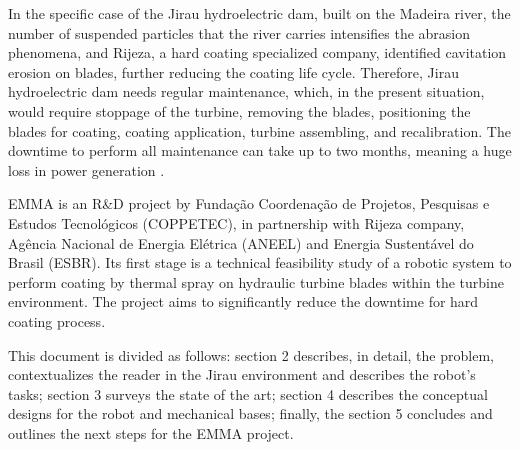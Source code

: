 In the specific case of the Jirau hydroelectric dam, built on the Madeira
river, the number of suspended particles that the river carries intensifies the
abrasion phenomena, and Rijeza, a hard coating specialized company, identified cavitation erosion on blades, further reducing the coating life cycle.
Therefore, Jirau hydroelectric dam needs regular maintenance, which,
in the present situation, would require stoppage of the turbine, removing the
blades, positioning the blades for coating, coating application, turbine assembling, and recalibration. The downtime to perform all
maintenance can take up to two months, meaning a huge loss in power generation .

EMMA is an R\&D project by Fundação Coordenação de Projetos, Pesquisas e Estudos
Tecnológicos (COPPETEC), in partnership with Rijeza company, Agência Nacional de
Energia Elétrica (ANEEL) and Energia Sustentável do Brasil (ESBR). Its first
stage is a technical feasibility study of a robotic system to perform
coating by thermal spray on hydraulic turbine blades within the turbine
environment. The project aims to significantly reduce the downtime for hard
coating process.

This document is divided as follows: section 2 describes, in detail, the
problem, contextualizes the reader in the Jirau environment and
describes the robot's tasks; section 3 surveys the state of the
art; section 4 describes the conceptual designs for the robot and mechanical
bases; finally, the section 5 concludes and outlines the next steps for the
EMMA project.
